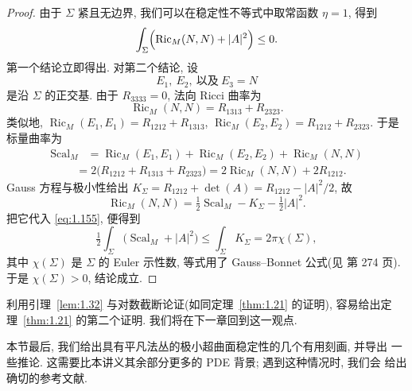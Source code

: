 \begin{proof}
由于 $\Sigma$ 紧且无边界, 我们可以在稳定性不等式中取常函数 $\eta=1$, 得到
\begin{equation}
\int_{\Sigma}\Bigl(\operatorname{Ric}_M(N,N)+|A|^{2}\Bigr)\leq0.
\label{eq:1.155}
\end{equation}
第一个结论立即得出. 对第二个结论, 设
\[
E_1,\ E_2,\ \text{以及}\ E_3=N
\]
是沿 $\Sigma$ 的正交基. 由于 $R_{3333}=0$, 法向 Ricci 曲率为
\begin{equation}
\operatorname{Ric}_M(N,N)=R_{1313}+R_{2323}.
\label{eq:1.156}
\end{equation}
类似地, $\operatorname{Ric}_M(E_1,E_1)=R_{1212}+R_{1313}$,
$\operatorname{Ric}_M(E_2,E_2)=R_{1212}+R_{2323}$. 于是标量曲率为
\begin{equation}
\begin{aligned}
\operatorname{Scal}_M
&=\operatorname{Ric}_M(E_1,E_1)+\operatorname{Ric}_M(E_2,E_2)
 +\operatorname{Ric}_M(N,N)
\label{eq:1.157}
\end{aligned}
\end{equation}
\begin{equation}
\begin{aligned}
&=2\bigl(R_{1212}+R_{1313}+R_{2323}\bigr)
 =2\operatorname{Ric}_M(N,N)+2R_{1212}.
\label{eq:1.158}
\end{aligned}
\end{equation}
Gauss 方程与极小性给出 $K_{\Sigma}=R_{1212}+\det(A)=R_{1212}-|A|^{2}/2$,
故
\begin{equation}
\operatorname{Ric}_M(N,N)=\tfrac12\operatorname{Scal}_M-K_{\Sigma}
 -\tfrac12|A|^{2}.
\label{eq:1.159}
\end{equation}
把它代入 \eqref{eq:1.155}, 便得到
\begin{equation}
\tfrac12\int_{\Sigma}
\bigl(\operatorname{Scal}_M+|A|^{2}\bigr)
 \leq\int_{\Sigma}K_{\Sigma}=2\pi\chi(\Sigma),
\label{eq:1.160}
\end{equation}
其中 $\chi(\Sigma)$ 是 $\Sigma$ 的 Euler 示性数, 等式用了 Gauss--Bonnet
公式(见 \cite{dC1} 第 274 页). 于是 $\chi(\Sigma)>0$, 结论成立.
\end{proof}

利用引理~\ref{lem:1.32} 与对数截断论证(如同定理~\ref{thm:1.21} 的证明),
容易给出定理~\ref{thm:1.21} 的第二个证明. 我们将在下一章回到这一观点.

本节最后, 我们给出具有平凡法丛的极小超曲面稳定性的几个有用刻画, 并导出
一些推论. 这需要比本讲义其余部分更多的 PDE 背景; 遇到这种情况时, 我们会
给出确切的参考文献.

